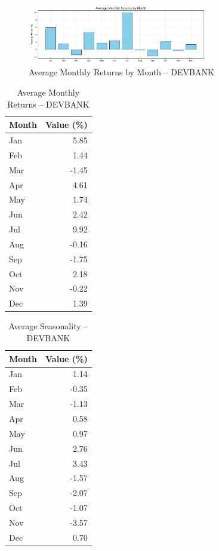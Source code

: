\documentclass[12pt]{article}
\begin{document}
\begin{figure}[h!]
    \centering
    \includegraphics[width=0.7\textwidth]{decomposition_outputs/DEVBANK_avg_monthly_returns.png}
    \caption{Average Monthly Returns by Month -- DEVBANK}
\end{figure}

\begin{table}[h!]
\centering
\caption{Average Monthly Returns -- DEVBANK}
\begin{tabular}{l r}
\toprule
Month & Value (\%) \\
\midrule
Jan & 5.85 \\
Feb & 1.44 \\
Mar & -1.45 \\
Apr & 4.61 \\
May & 1.74 \\
Jun & 2.42 \\
Jul & 9.92 \\
Aug & -0.16 \\
Sep & -1.75 \\
Oct & 2.18 \\
Nov & -0.22 \\
Dec & 1.39 \\
\bottomrule
\end{tabular}
\end{table}

\begin{table}[h!]
\centering
\caption{Average Seasonality -- DEVBANK}
\begin{tabular}{l r}
\toprule
Month & Value (\%) \\
\midrule
Jan & 1.14 \\
Feb & -0.35 \\
Mar & -1.13 \\
Apr & 0.58 \\
May & 0.97 \\
Jun & 2.76 \\
Jul & 3.43 \\
Aug & -1.57 \\
Sep & -2.07 \\
Oct & -1.07 \\
Nov & -3.57 \\
Dec & 0.70 \\
\bottomrule
\end{tabular}
\end{table}
\end{document}
